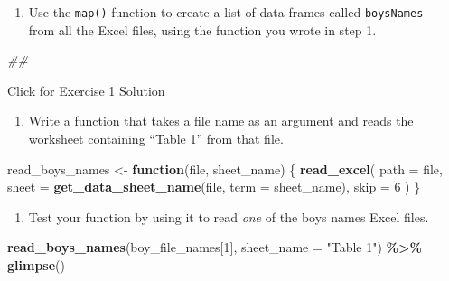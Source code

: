 \documentclass[
]{book}
\newenvironment{Shaded}{\begin{snugshade}}{\end{snugshade}}
\newcommand{\CommentTok}[1]{\textcolor[rgb]{0.56,0.35,0.01}{\textit{#1}}}
\newcommand{\ControlFlowTok}[1]{\textcolor[rgb]{0.13,0.29,0.53}{\textbf{#1}}}
\newcommand{\DataTypeTok}[1]{\textcolor[rgb]{0.13,0.29,0.53}{#1}}
\newcommand{\DecValTok}[1]{\textcolor[rgb]{0.00,0.00,0.81}{#1}}
\newcommand{\KeywordTok}[1]{\textcolor[rgb]{0.13,0.29,0.53}{\textbf{#1}}}
\newcommand{\NormalTok}[1]{#1}
\newcommand{\OperatorTok}[1]{\textcolor[rgb]{0.81,0.36,0.00}{\textbf{#1}}}
\newcommand{\StringTok}[1]{\textcolor[rgb]{0.31,0.60,0.02}{#1}}
\providecommand{\tightlist}{%
  \setlength{\itemsep}{0pt}\setlength{\parskip}{0pt}}
\begin{document}
\begin{enumerate}
\def\labelenumi{\arabic{enumi}.}
\setcounter{enumi}{2}
\tightlist
\item
  Use the \texttt{map()} function to create a list of data frames called \texttt{boysNames}\\
  from all the Excel files, using the function you wrote in step 1.
\end{enumerate}

\begin{Shaded}
\begin{Highlighting}[]
\CommentTok{\#\# }
\end{Highlighting}
\end{Shaded}

{Click for Exercise 1 Solution}

\begin{alert}

\begin{enumerate}
\def\labelenumi{\arabic{enumi}.}
\tightlist
\item
  Write a function that takes a file name as an argument and reads the worksheet containing ``Table 1'' from that file.
\end{enumerate}

\begin{Shaded}
\begin{Highlighting}[]
\NormalTok{read\_boys\_names \textless{}{-}}\StringTok{ }\ControlFlowTok{function}\NormalTok{(file, sheet\_name) \{}
  \KeywordTok{read\_excel}\NormalTok{(}
    \DataTypeTok{path =}\NormalTok{ file,}
    \DataTypeTok{sheet =} \KeywordTok{get\_data\_sheet\_name}\NormalTok{(file, }\DataTypeTok{term =}\NormalTok{ sheet\_name),}
    \DataTypeTok{skip =} \DecValTok{6}
\NormalTok{  )}
\NormalTok{\}}
\end{Highlighting}
\end{Shaded}

\begin{enumerate}
\def\labelenumi{\arabic{enumi}.}
\setcounter{enumi}{1}
\tightlist
\item
  Test your function by using it to read \emph{one} of the boys names Excel files.
\end{enumerate}

\begin{Shaded}
\begin{Highlighting}[]
\KeywordTok{read\_boys\_names}\NormalTok{(boy\_file\_names[}\DecValTok{1}\NormalTok{], }\DataTypeTok{sheet\_name =} \StringTok{"Table 1"}\NormalTok{) }\OperatorTok{\%\textgreater{}\%}\StringTok{ }\KeywordTok{glimpse}\NormalTok{()}
\end{Highlighting}
\end{Shaded}


\end{alert}
\end{document}
